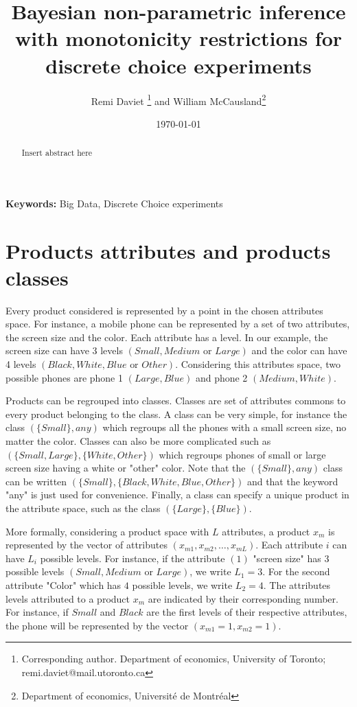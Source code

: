 \documentclass[12pt]{article}
\begin{document}
\title{Bayesian non-parametric inference with monotonicity restrictions for discrete choice experiments}
\author{
	Remi Daviet \footnote{Corresponding author. Department of economics, University of Toronto; remi.daviet@mail.utoronto.ca} \quad and \quad
	William McCausland\footnote{Department of economics, Universit\'e de Montr\'eal}
}
\date{\today}


\maketitle

\begin{abstract}
	Insert abstract here
\smallskip


\end{abstract}

\quad

\textbf{Keywords:} Big Data, Discrete Choice experiments

\newpage

\section{Products attributes and products classes}

Every product considered is represented by a point in the chosen attributes space. For instance, a mobile phone can be represented by a set of two attributes, the screen size and the color. Each attribute has a level. In our example, the screen size can have 3 levels $(Small, Medium \text{ or } Large)$ and the color can have 4 levels $(Black, White, Blue \text{ or } Other)$.  Considering this attributes space, two possible phones are phone 1 $(Large,Blue)$ and phone 2 $(Medium, White)$.

Products can be regrouped into classes. Classes are set of attributes commons to every product  belonging to the class. A class can be very simple, for instance the class $(\{Small\},any)$ which regroups all the phones with a small screen size, no matter the color. Classes can also be more complicated such as $(\{Small,Large\},\{White,Other\})$ which regroups phones of small or large screen size having a white or "other" color. Note that the $(\{Small\},any)$ class can be written $(\{Small\},\{ Black,White,Blue,Other\})$ and that the keyword "any" is just used for convenience. Finally, a class can specify a unique product in the attribute space, such as the class $(\{Large\},\{Blue\})$.

More formally, considering a product space with $L$ attributes, a product $x_m$ is represented by the vector of attributes $(x_{m1},x_{m2},\ldots,x_{mL})$. Each attribute $i$ can have $L_i$ possible levels. For instance, if the attribute $(1)$ "screen size" has $3$ possible levels $(Small, Medium \text{ or } Large)$, we write $L_1=3$. For the second attribute "Color" which has $4$ possible levels, we write $L_2=4$. The attributes levels attributed to a product $x_m$ are indicated by their corresponding number. For instance, if $Small$ and $Black$ are the first levels of their respective attributes, the phone will be represented by the vector $(x_{m1}=1,x_{m2}=1)$.
\end{document}
